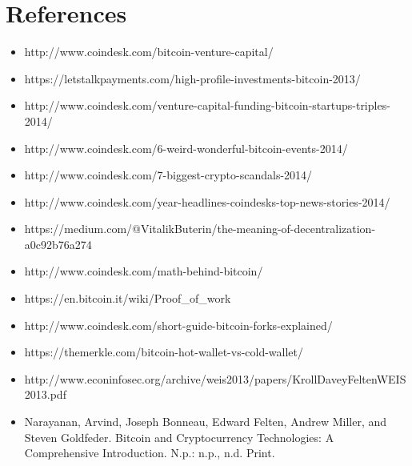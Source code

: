 \documentclass[11pt]{article}
\begin{document}
    
    \setlength{\parindent}{0pt}
    
    \section*{References}
    \begin{itemize}
        \item http://www.coindesk.com/bitcoin-venture-capital/
        \item https://letstalkpayments.com/high-profile-investments-bitcoin-2013/ 
        \item http://www.coindesk.com/venture-capital-funding-bitcoin-startups-triples-2014/ 
        \item http://www.coindesk.com/6-weird-wonderful-bitcoin-events-2014/ 
        \item http://www.coindesk.com/7-biggest-crypto-scandals-2014/ 
        \item http://www.coindesk.com/year-headlines-coindesks-top-news-stories-2014/ 
        \item https://medium.com/@VitalikButerin/the-meaning-of-decentralization-a0c92b76a274 
        \item http://www.coindesk.com/math-behind-bitcoin/
        \item https://en.bitcoin.it/wiki/Proof\_of\_work
        \item http://www.coindesk.com/short-guide-bitcoin-forks-explained/
        \item https://themerkle.com/bitcoin-hot-wallet-vs-cold-wallet/
        \item http://www.econinfosec.org/archive/weis2013/papers/KrollDaveyFeltenWEIS2013.pdf
        \item Narayanan, Arvind, Joseph Bonneau, Edward Felten, Andrew Miller, and Steven Goldfeder. Bitcoin and Cryptocurrency Technologies: A Comprehensive Introduction. N.p.: n.p., n.d. Print.
        
    \end{itemize}
    
\end{document}
